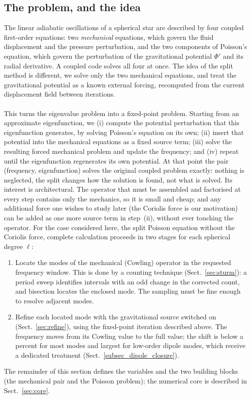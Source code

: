 \documentclass[]{aa}
\begin{document}
\subsection{The problem, and the idea}
\label{sec:overview}
The linear adiabatic oscillations of a spherical star are described by four coupled first-order equations: two \emph{mechanical} equations, which govern the fluid displacement and the pressure perturbation, and the two components of Poisson's equation, which govern the perturbation of the gravitational potential $\Phi'$ and its radial derivative.  A coupled code solves all four at once.  The idea of the split method is different, we solve only the two mechanical equations, and treat the gravitational potential as a known external forcing, recomputed from the current displacement field between iterations.
\\~\\This turns the eigenvalue problem into a fixed-point problem.  Starting from an approximate eigenfunction, we (i) compute the potential perturbation that this eigenfunction generates, by solving Poisson's equation on its own; (ii) insert that potential into the mechanical equations as a fixed source term; (iii) solve the resulting forced mechanical problem and update the frequency; and (iv) repeat until the eigenfunction regenerates its own potential.  At that point the pair (frequency, eigenfunction) solves the original coupled problem exactly: nothing is neglected, the split changes how the solution is found, not what is solved.  Its interest is architectural.  The operator that must be assembled and factorised at every step contains only the mechanics, so it is small and cheap; and any additional force one wishes to study later (the Coriolis force is our
motivation) can be added as one more source term in step~(ii), without ever touching the operator.
For the case considered here, the split Poisson equation without the Coriolis force, complete calculation proceeds in two stages for each spherical degree $\ell$:
\begin{enumerate}
\item Locate the modes of the mechanical (Cowling) operator in the requested frequency window. This is done by a counting technique (Sect.~\ref{sec:sturm}): a period sweep identifies intervals with an odd change in the corrected count, and bisection locates the enclosed mode. The sampling must be fine enough to resolve adjacent modes.
\item Refine each located mode with the gravitational source switched on (Sect.~\ref{sec:refine}), using the fixed-point iteration described above.  The frequency moves from its Cowling value to the full value; the shift is below a percent for most modes and largest for low-order dipole modes, which receive a dedicated treatment (Sect.~\ref{subsec_dipole_closure}).
\end{enumerate}
The remainder of this section defines the variables and the two building blocks (the mechanical pair and the Poisson problem); the numerical core is described in Sect.~\ref{sec:core}.
\end{document}
